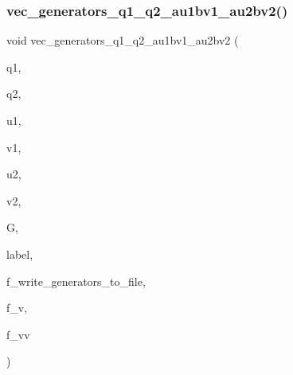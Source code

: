 \subsubsection{\texorpdfstring{vec\+\_\+generators\+\_\+q1\+\_\+q2\+\_\+au1bv1\+\_\+au2bv2()}{vec\_generators\_q1\_q2\_au1bv1\_au2bv2()}}
{\footnotesize\ttfamily void vec\+\_\+generators\+\_\+q1\+\_\+q2\+\_\+au1bv1\+\_\+au2bv2 (\begin{DoxyParamCaption}\item[{\mbox{\hyperlink{galois_8h_a09fddde158a3a20bd2dcadb609de11dc}{I\+NT}}}]{q1,  }\item[{\mbox{\hyperlink{galois_8h_a09fddde158a3a20bd2dcadb609de11dc}{I\+NT}}}]{q2,  }\item[{\mbox{\hyperlink{galois_8h_a09fddde158a3a20bd2dcadb609de11dc}{I\+NT}}}]{u1,  }\item[{\mbox{\hyperlink{galois_8h_a09fddde158a3a20bd2dcadb609de11dc}{I\+NT}}}]{v1,  }\item[{\mbox{\hyperlink{galois_8h_a09fddde158a3a20bd2dcadb609de11dc}{I\+NT}}}]{u2,  }\item[{\mbox{\hyperlink{galois_8h_a09fddde158a3a20bd2dcadb609de11dc}{I\+NT}}}]{v2,  }\item[{\mbox{\hyperlink{class_vector}{Vector}} \&}]{G,  }\item[{\mbox{\hyperlink{classhollerith}{hollerith}} \&}]{label,  }\item[{\mbox{\hyperlink{galois_8h_a09fddde158a3a20bd2dcadb609de11dc}{I\+NT}}}]{f\+\_\+write\+\_\+generators\+\_\+to\+\_\+file,  }\item[{\mbox{\hyperlink{galois_8h_a09fddde158a3a20bd2dcadb609de11dc}{I\+NT}}}]{f\+\_\+v,  }\item[{\mbox{\hyperlink{galois_8h_a09fddde158a3a20bd2dcadb609de11dc}{I\+NT}}}]{f\+\_\+vv }\end{DoxyParamCaption})}

\mbox{\label{perm__group__gens_8_c_a0b5ce8828dd8a35cbfec4450f0d76edc}} 
